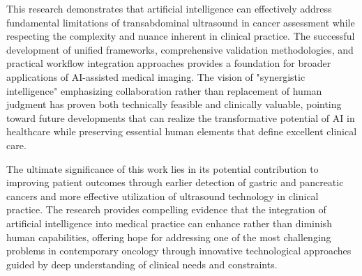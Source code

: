 This research demonstrates that artificial intelligence can effectively address fundamental limitations of transabdominal ultrasound in cancer assessment while respecting the complexity and nuance inherent in clinical practice. The successful development of unified frameworks, comprehensive validation methodologies, and practical workflow integration approaches provides a foundation for broader applications of AI-assisted medical imaging. The vision of "synergistic intelligence" emphasizing collaboration rather than replacement of human judgment has proven both technically feasible and clinically valuable, pointing toward future developments that can realize the transformative potential of AI in healthcare while preserving essential human elements that define excellent clinical care.

The ultimate significance of this work lies in its potential contribution to improving patient outcomes through earlier detection of gastric and pancreatic cancers and more effective utilization of ultrasound technology in clinical practice. The research provides compelling evidence that the integration of artificial intelligence into medical practice can enhance rather than diminish human capabilities, offering hope for addressing one of the most challenging problems in contemporary oncology through innovative technological approaches guided by deep understanding of clinical needs and constraints.